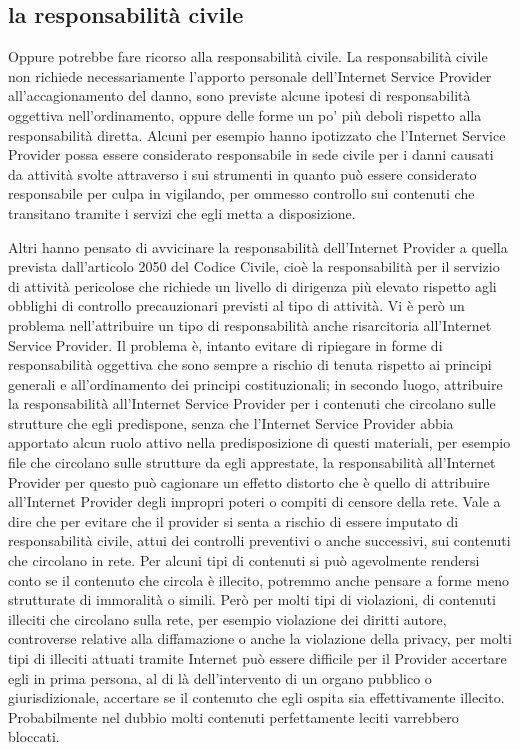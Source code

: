 \subsection{la responsabilità civile}
Oppure potrebbe fare ricorso alla responsabilità civile. La responsabilità civile non richiede necessariamente l'apporto personale dell'Internet Service Provider all'accagionamento del danno, sono previste alcune ipotesi di responsabilità oggettiva nell'ordinamento, oppure delle forme un po' più deboli rispetto alla responsabilità diretta. Alcuni per esempio hanno ipotizzato che l'Internet Service Provider possa essere considerato responsabile in sede civile per i danni causati da attività svolte attraverso i sui strumenti in quanto può essere considerato responsabile per culpa in vigilando, per ommesso controllo sui contenuti che transitano tramite i servizi che egli metta a disposizione. 

Altri hanno pensato di avvicinare la responsabilità dell'Internet Provider a quella prevista dall'articolo 2050 del Codice Civile, cioè la responsabilità per il servizio di attività pericolose che richiede un livello di dirigenza più elevato rispetto agli obblighi di controllo precauzionari previsti al tipo di attività. Vi è però un problema nell'attribuire un tipo di responsabilità anche risarcitoria all'Internet Service Provider. Il problema è, intanto evitare di ripiegare in forme di responsabilità oggettiva che sono sempre a rischio di tenuta rispetto ai principi generali e all'ordinamento dei principi costituzionali; in secondo luogo, attribuire la responsabilità all'Internet Service Provider per i contenuti che circolano sulle strutture che egli predispone, senza che l'Internet Service Provider abbia apportato alcun ruolo attivo nella predisposizione di questi materiali, per esempio file che circolano sulle strutture da egli apprestate, la responsabilità all'Internet Provider per questo può cagionare un effetto distorto che è quello di attribuire all'Internet Provider degli impropri poteri o compiti di censore della rete. Vale a dire che per evitare che il provider si senta a rischio di essere imputato di responsabilità civile, attui dei controlli preventivi o anche successivi, sui contenuti che circolano in rete.
Per alcuni tipi di contenuti si può agevolmente rendersi conto se il contenuto che circola è illecito, potremmo anche pensare a forme meno strutturate di immoralità o simili. Però per molti tipi di violazioni, di contenuti illeciti che circolano sulla rete, per esempio violazione dei diritti autore, controverse relative alla diffamazione o anche la violazione della privacy, per molti tipi di illeciti attuati tramite Internet può essere difficile per il Provider accertare egli in prima persona, al di là dell'intervento di un organo pubblico o giurisdizionale, accertare se il contenuto che egli ospita sia effettivamente illecito. Probabilmente nel dubbio molti contenuti perfettamente leciti varrebbero bloccati. 

